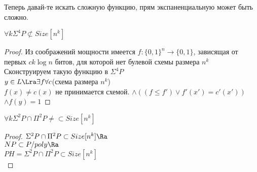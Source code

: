 Теперь давай-те искать сложную функцию, прям экспаненциальную может быть сложно.
\begin{theorem}
	$\forall k \Sigma^4P \not \subset Size[n^k]$\\
\end{theorem}
\begin{proof}
	Из соображений мощности имеется $f\colon \{0, 1\}^n \to \{0, 1\}$, зависящая 
	от первых $ck\log n$ битов, для которой нет булевой схемы размера $n^k$\\

	Сконструируем такую функцию в $\Sigma^4P$\\
	$y \in L \Lra \exists f \forall c$(схема размера $n^k$)\\
	$f(x) \ne c(x)$ не принимается схемой.
	$\wedge ((f \le f') \vee f'(x') = c'(x'))$
	$\wedge f(y) = 1$ 
\end{proof}

\begin{conseq}
	$\forall k \Sigma^2 P \cap \Pi^2P \ne \subset Size[n^k]$
\end{conseq}
\begin{proof}
	$\Sigma^2P \cap \Pi^2P \subset Size[n^k] \Ra $\\
	$NP \subset P/poly \Ra$\\
	$PH = \Sigma^2P \cap \Pi^2P \subset Size[n^k]$\\
\end{proof}
